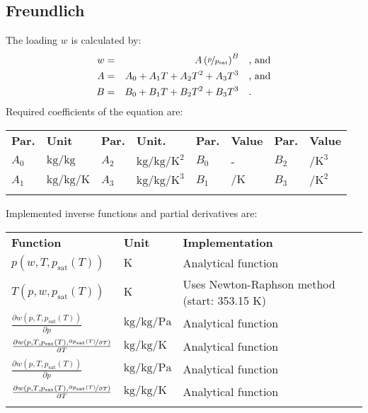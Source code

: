 \subsection{Freundlich}
\label{cha:approaches:ads:surp:freundlich}
%
The loading $w$ is calculated by:
%
\begin{equation*}
	\begin{split}
		w &=& A \left( \nicefrac{p}{p_\mathrm{sat}} \right) ^{B} & \quad\text{, and} \\
		A &=& A_0 + A_1 T + A_2 T^2 + A_3 T^3 & \quad\text{, and} \\
		B &=& B_0 + B_1 T + B_2 T^2 + B_3 T^3 & \quad\text{.} \\
	\end{split}
\end{equation*}
%
Required coefficients of the equation are:
%
\begin{longtable}[l]{ll|ll|ll|ll}
	\toprule
	\addlinespace
	\textbf{Par.} & \textbf{Unit} & \textbf{Par.} &	\textbf{Unit.} & \textbf{Par.} & \textbf{Value} & \textbf{Par.} & \textbf{Value} \\
	\addlinespace
	\midrule
	\endhead
	
	\bottomrule
	\endfoot
	\bottomrule
	\endlastfoot
	\addlinespace
	
	$A_0$ & $\si{\kilogram\per\kilogram}$ & $A_2$ & $\si{\kilogram\per\kilogram\per\square\kelvin}$ & $B_0$ & - & $B_2$ & $\si{\per\cubic\kelvin}$ \\
	$A_1$ & $\si{\kilogram\per\kilogram\per\kelvin}$ & $A_3$ & $\si{\kilogram\per\kilogram\per\cubic\kelvin}$ & $B_1$ & $\si{\per\kelvin}$ & $B_3$ & $\si{\per\square\kelvin}$ \\
	
	\addlinespace
\end{longtable}
%
Implemented inverse functions and partial derivatives are:
%
\begin{longtable}[l]{l|l|p{7.5cm}}
	\toprule
	\addlinespace
	\textbf{Function} & \textbf{Unit} &	\textbf{Implementation} \\
	\addlinespace
	\midrule
	\endhead
	
	\bottomrule
	\endfoot
	\bottomrule
	\endlastfoot
	\addlinespace
	
	$p(w,T,p_\mathrm{sat}(T))$	& $\si{\kelvin}$ & Analytical function\\
	$T(p,w,p_\mathrm{sat}(T))$	& $\si{\kelvin}$ & Uses Newton-Raphson method (start: 353.15 K) \\
	$\frac{\partial w(p,T,p_\mathrm{sat}(T))}{\partial p}$	& $\si{\kilogram\per\kilogram\per\pascal}$ & Analytical function\\
	$\frac{\partial w(p,T,p_\mathrm{sat}(T),\nicefrac{\partial p_\mathrm{sat}(T)}{\partial T})}{\partial T}$	& $\si{\kilogram\per\kilogram\per\kelvin}$ & Analytical function\\
	$\frac{\partial w(p,T,p_\mathrm{sat}(T))}{\partial p}$	& $\si{\kilogram\per\kilogram\per\pascal}$ & Analytical function\\
	$\frac{\partial w(p,T,p_\mathrm{sat}(T),\nicefrac{\partial p_\mathrm{sat}(T)}{\partial T})}{\partial T}$	& $\si{\kilogram\per\kilogram\per\kelvin}$ & Analytical function\\
	
	\addlinespace
\end{longtable}
